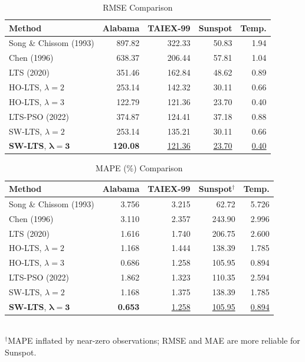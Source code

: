 \documentclass[conference]{IEEEtran}
\begin{document}
\begin{table}[htbp]
\centering
\caption{RMSE Comparison}
\label{tab:rmse}
\begin{tabular}{@{}lrrrr@{}}
\toprule
Method & Alabama & TAIEX-99 & Sunspot & Temp. \\
\midrule
Song \& Chissom (1993) & 897.82 & 322.33 & 50.83 & 1.94 \\
Chen (1996)            & 638.37 & 206.44 & 57.81 & 1.04 \\
LTS (2020)             & 351.46 & 162.84 & 48.62 & 0.89 \\
HO-LTS, $\lambda=2$   & 253.14 & 142.32 & 30.11 & 0.66 \\
HO-LTS, $\lambda=3$   & 122.79 & 121.36 & 23.70 & 0.40 \\
LTS-PSO (2022)         & 374.87 & 124.41 & 37.18 & 0.88 \\
\midrule
SW-LTS, $\lambda=2$   & 253.14 & 135.21 & 30.11 & 0.66 \\
\textbf{SW-LTS}, $\bm{\lambda=3}$ & \textbf{120.08} & \underline{121.36} & \underline{23.70} & \underline{0.40} \\
\bottomrule
\end{tabular}
\end{table}

\begin{table}[htbp]
\centering
\caption{MAPE (\%) Comparison}
\label{tab:mape}
\begin{tabular}{@{}lrrrr@{}}
\toprule
Method & Alabama & TAIEX-99 & Sunspot$^\dagger$ & Temp. \\
\midrule
Song \& Chissom (1993) & 3.756 & 3.215 &  62.72 & 5.726 \\
Chen (1996)            & 3.110 & 2.357 & 243.90 & 2.996 \\
LTS (2020)             & 1.616 & 1.740 & 206.75 & 2.600 \\
HO-LTS, $\lambda=2$   & 1.168 & 1.444 & 138.39 & 1.785 \\
HO-LTS, $\lambda=3$   & 0.686 & 1.258 & 105.95 & 0.894 \\
LTS-PSO (2022)         & 1.862 & 1.323 & 110.35 & 2.594 \\
\midrule
SW-LTS, $\lambda=2$   & 1.168 & 1.375 & 138.39 & 1.785 \\
\textbf{SW-LTS}, $\bm{\lambda=3}$ & \textbf{0.653} & \underline{1.258} & \underline{105.95} & \underline{0.894} \\
\bottomrule
\end{tabular}\\[3pt]
{\footnotesize $^\dagger$MAPE inflated by near-zero observations; RMSE
and MAE are more reliable for Sunspot.}
\end{table}
\end{document}

